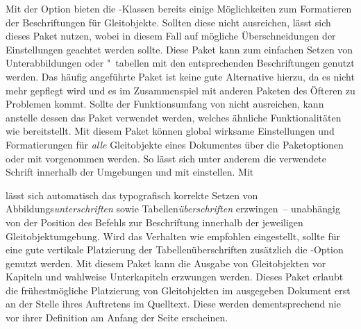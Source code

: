 %
%
\begin{DeclarePackages}
  Mit der Option  bieten die 
  \KOMAScript-Klassen bereits einige Möglichkeiten zum Formatieren der 
  Beschriftungen für Gleitobjekte. Sollten diese nicht ausreichen, lässt sich 
  dieses Paket nutzen, wobei in diesem Fall auf mögliche Überschneidungen der 
  Einstellungen geachtet werden sollte.
  Diese Paket kann zum einfachen Setzen von Unterabbildungen oder "~tabellen 
  mit den entsprechenden Beschriftungen genutzt werden. Das häufig angeführte 
  Paket  ist keine gute Alternative hierzu, da es nicht mehr 
  gepflegt wird und es im Zusammenspiel mit anderen Paketen des Öfteren zu 
  Problemen kommt. Sollte der Funktionsumfang von  nicht 
  ausreichen, kann anstelle dessen das Paket  verwendet 
  werden, welches ähnliche Funktionalitäten wie  bereitstellt.
  Mit diesem Paket können global wirksame Einstellungen und Formatierungen für 
  \emph{alle} Gleitobjekte eines Dokumentes über die Paketoptionen oder mit 
   vorgenommen werden. So lässt sich unter 
  anderem die verwendete Schrift innerhalb der Umgebungen  
  und  mit  
  einstellen. Mit 
\begin{quoting}[rightmargin=0pt]
\begin{Code}
\end{Code}
\end{quoting}
  lässt sich automatisch das typografisch korrekte Setzen von 
  Abbildungs\emph{unterschriften} sowie Tabellen\emph{überschriften} 
  erzwingen~-- unabhängig von der Position des Befehls zur Beschriftung 
   innerhalb der jeweiligen Gleitobjektumgebung. Wird das 
  Verhalten wie empfohlen eingestellt, sollte für eine gute vertikale 
  Platzierung der Tabellenüberschriften zusätzlich die \KOMAScript-Option 
   genutzt werden.
  Mit diesem Paket kann die Ausgabe von Gleitobjekten vor Kapiteln und wahlweise
  Unterkapiteln erzwungen werden.
  Dieses Paket erlaubt die frühestmögliche Platzierung von Gleitobjekten im 
  ausgegeben Dokument erst an der Stelle ihres Auftretens im Quelltext. Diese 
  werden dementsprechend nie vor ihrer Definition am Anfang der Seite 
  erscheinen.
\end{DeclarePackages}
%




